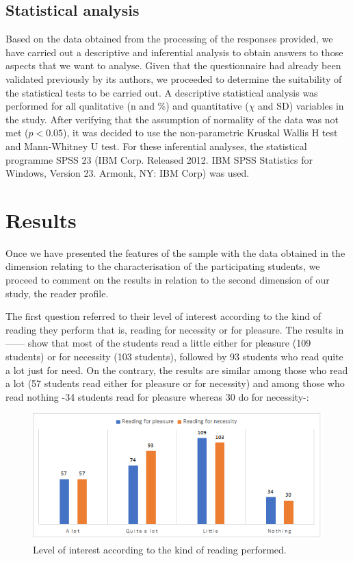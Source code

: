 \documentclass[english]{textolivre}
\begin{document}
\subsection{Statistical analysis}
Based on the data obtained from the processing of the responses provided, we have carried out a descriptive and inferential analysis to obtain answers to those aspects that we want to analyse. Given that the questionnaire had already been validated previously by its authors, we proceeded to determine the suitability of the statistical tests to be carried out. A descriptive statistical analysis was performed for all qualitative (n and \%) and quantitative ($\chi$ and SD) variables in the study. After verifying that the assumption of normality of the data was not met ($p < 0.05$), it was decided to use the non-parametric Kruskal Wallis H test and Mann-Whitney U test. For these inferential analyses, the statistical programme SPSS 23 (IBM Corp. Released 2012. IBM SPSS Statistics for Windows, Version 23. Armonk, NY: IBM Corp) was used.


\section{Results}
Once we have presented the features of the sample with the data obtained in the dimension relating to the characterisation of the participating students, we proceed to comment on the results in relation to the second dimension of our study, the reader profile.

The first question referred to their level of interest according to the kind of reading they perform that is, reading for necessity or for pleasure. The results in —— show that most of the students read a little either for pleasure (109 students) or for necessity (103 students), followed by 93 students who read quite a lot just for need. On the contrary, the results are similar among those who read a lot (57 students read either for pleasure or for necessity) and among those who read nothing -34 students read for pleasure whereas 30 do for necessity-:

\begin{figure}[htbp]
\centering
\begin{minipage}{0.85\textwidth}
 \includegraphics[width=\textwidth]{Imagem1.png}
 \caption{Level of interest according to the kind of reading performed.}
 \label{fig01}
\end{minipage}
\end{figure}
\end{document}
